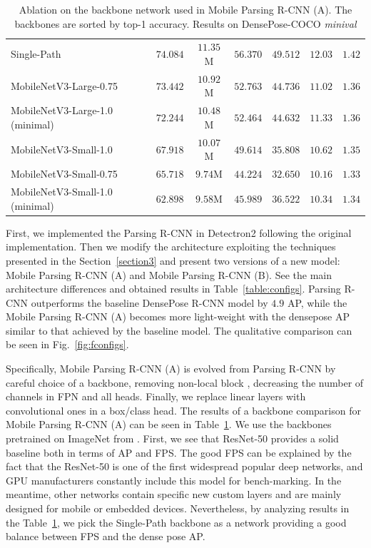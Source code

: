 \begin{table}[t!]
{\begin{tabular}{lcccccc}
Single-Path \cite{spnasnet} & $74.084$ & $11.35$M & $56.370$ & $49.512$ & $\mathbf{12.03}$ & $\mathbf{1.42}$ \\
MobileNetV3-Large-0.75 \cite{mobilenetv3} & $73.442$ & $10.92$M & $52.763$ & $44.736$ & $11.02$ & $1.36$ \\
MobileNetV3-Large-1.0 (minimal) \cite{mobilenetv3} & $72.244$ & $10.48$M & $52.464$ & $44.632$ & $11.33$ & $1.36$ \\
MobileNetV3-Small-1.0 \cite{mobilenetv3} & $67.918$ & $10.07$M & $49.614$ & $35.808$ & $10.62$ & $1.35$ \\
MobileNetV3-Small-0.75 \cite{mobilenetv3} & $65.718$ & $9.74$M & $44.224$ & $32.650$ & $10.16$ & $1.33$ \\
MobileNetV3-Small-1.0 (minimal) \cite{mobilenetv3} & $62.898$ & $9.58$M & $45.989$ & $36.522$ & $10.34$ & $1.34$ \\\hline
\end{tabular}}
\caption{Ablation on the backbone network used in Mobile Parsing R-CNN (A). The backbones are sorted by top-1 accuracy. Results on DensePose-COCO \textit{minival}}
\label{table:backbones}
\end{table}

First, we implemented the Parsing R-CNN \cite{parsing} in Detectron2 following the original implementation. Then we modify the architecture exploiting the techniques presented in the Section~\ref{section3} and present two versions of a new model: Mobile Parsing R-CNN (A) and Mobile Parsing R-CNN (B). See the main architecture differences and obtained results in Table~\ref{table:configs}. Parsing R-CNN outperforms the baseline DensePose R-CNN model by $4.9$ AP, while the Mobile Parsing R-CNN (A) becomes more light-weight with the densepose AP similar to that achieved by the baseline model. The qualitative comparison can be seen in Fig.~\ref{fig:fconfigs}.

Specifically, Mobile Parsing R-CNN (A) is evolved from Parsing R-CNN by careful choice of a backbone, removing non-local block \cite{nonlocal}, decreasing the number of channels in FPN and all heads. Finally, we replace linear layers with convolutional ones in a box/class head. The results of a backbone comparison for Mobile Parsing R-CNN (A) can be seen in Table~\ref{table:backbones}. We use the backbones pretrained on ImageNet from \cite{geffnet}. First, we see that ResNet-50 provides a solid baseline both in terms of AP and FPS. The good FPS can be explained by the fact that the ResNet-50 is one of the first widespread popular deep networks, and GPU manufacturers constantly include this model for bench-marking. In the meantime, other networks contain specific new custom layers and are mainly designed for mobile or embedded devices. Nevertheless, by analyzing results in the Table~\ref{table:backbones}, we pick the Single-Path \cite{spnasnet} backbone as a network providing a good balance between FPS and the dense pose AP.

